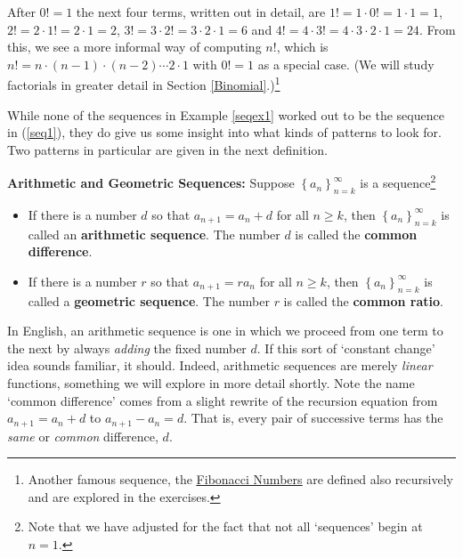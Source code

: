 \documentclass{ximera}
\begin{document}
 After $0! = 1$ the next four terms, written out in detail, are $1! = 1 \cdot 0! = 1 \cdot 1 = 1$, $2! = 2 \cdot 1! = 2 \cdot 1 = 2$, $3! = 3 \cdot 2! = 3 \cdot 2 \cdot 1 = 6$ and  $4! = 4 \cdot 3! = 4 \cdot 3 \cdot 2 \cdot 1 = 24$.  From this, we see a more informal way of computing  $n!$, which is $n! = n\cdot(n -1)\cdot(n -2) \cdots 2 \cdot 1$ with $0! = 1$ as a special case.  (We will study factorials in greater detail in Section \ref{Binomial}.)\footnote{Another  famous sequence, the \href{http://en.wikipedia.org/wiki/Fibonacci_number}{\underline{Fibonacci Numbers}} are defined also recursively and are explored in the exercises.}  
 
 While none of the sequences in Example \ref{seqex1} worked out to be the sequence in (\ref{seq1}), they do give us some insight into what kinds of patterns to look for.  Two patterns in particular are given in the next definition.

 

\begin{definition}  \label{arithgeodefn}  \textbf{Arithmetic and Geometric Sequences:}  Suppose $\left\{ a_{n} \right\}_{n=k}^{\infty}$ is a sequence\footnote{Note that we have adjusted for the fact that not all `sequences' begin at $n=1$.}

\begin{itemize}

\item If  there is a number $d$ so that $a_{n+1}  = a_{n} + d$ for all $n \geq k$, then $\left\{ a_{n} \right\}_{n=k}^{\infty}$ is called an \textbf{arithmetic sequence}.  The number $d$ is called the  \textbf{common difference}.

\item If  there is a number $r$ so that $a_{n+1} = r a_{n}$ for all $n \geq k$, then $\left\{ a_{n} \right\}_{n=k}^{\infty}$ is called a \textbf{geometric sequence}.  The number $r$ is called the \textbf{common ratio}.

\end{itemize}


\end{definition}

   

In English, an arithmetic sequence is one in which we proceed from one term to the next by always \textit{adding} the fixed number $d$.  If this sort of `constant change' idea sounds familiar, it should.  Indeed, arithmetic sequences are merely \textit{linear} functions, something we will explore in more detail shortly.  Note the name `common difference' comes from a slight rewrite of the recursion equation from $a_{n+1}  = a_{n} + d$ to $a_{n+1} - a_{n} = d$.  That is, every pair of successive terms has the \textit{same} or \textit{common} difference,  $d$.
\end{document}
